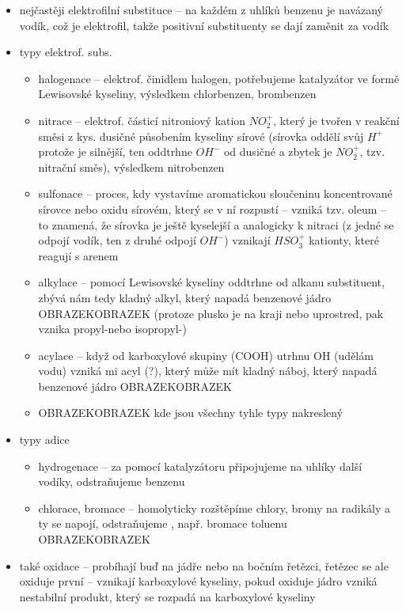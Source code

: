 \documentclass{article}
\begin{document}
\begin{itemize}
\begin{itemize}
    \item nejčastěji elektrofilní substituce -- na každém z uhlíků benzenu je navázaný vodík, což je elektrofil, takže positivní substituenty se dají zaměnit za vodík
    \item typy elektrof. subs.
    \begin{itemize}
      \item halogenace -- elektrof. činidlem halogen, potřebujeme katalyzátor ve formě Lewisovské kyseliny, výsledkem chlorbenzen, brombenzen
      \item nitrace -- elektrof. částicí nitroniový kation $NO_2^+$, který je tvořen v reakční směsi z kys. dusičné působením kyseliny sírové (sírovka oddělí svůj $H^{+}$ protože je silnější, ten oddtrhne $OH^{-}$ od dusičné a zbytek je $NO_2^{+}$, tzv. nitrační směs), výsledkem nitrobenzen
      \item sulfonace -- proces, kdy vystavíme aromatickou sloučeninu koncentrované sírovce nebo oxidu sírovém, který se v ní rozpustí -- vzniká tzv. oleum -- to znamená, že sírovka je ještě kyselejší a analogicky k nitraci (z jedné se odpojí vodík, ten z druhé odpojí $OH^{-}$) vznikají $HSO_3^{+}$ kationty, které reagují s arenem
      \item alkylace -- pomocí Lewisovské kyseliny oddtrhne od alkanu substituent, zbývá nám tedy kladný alkyl, který napadá benzenové jádro OBRAZEKOBRAZEK (protoze plusko je na kraji nebo uprostred, pak vznika propyl-nebo isopropyl-)
      \item acylace -- když od karboxylové skupiny (COOH) utrhnu OH (udělám vodu) vzniká mi acyl (?), který může mít kladný náboj, který napadá benzenové jádro OBRAZEKOBRAZEK
      \item OBRAZEKOBRAZEK kde jsou všechny tyhle typy nakreslený
    \end{itemize}
    \item typy adice
    \begin{itemize}
      \item hydrogenace -- za pomocí katalyzátoru připojujeme na uhlíky další vodíky, odstraňujeme   benzenu
      \item chlorace, bromace -- homolyticky rozštěpíme chlory, bromy na radikály a ty se napojí, odstraňujeme , např. bromace toluenu OBRAZEKOBRAZEK
    \end{itemize}
    \item také oxidace -- probíhají buď na jádře nebo na bočním řetězci, řetězec se ale oxiduje první -- vznikají karboxylové kyseliny, pokud oxiduje jádro vzniká nestabilní produkt, který se rozpadá na karboxylové kyseliny

\end{itemize}
\end{itemize}
\end{document}

